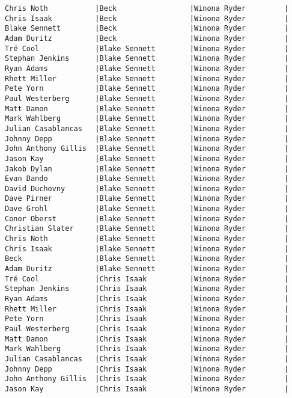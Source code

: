\documentclass{article}
\begin{document}
\begin{verbatim}
Chris Noth           |Beck                 |Winona Ryder         |
Chris Isaak          |Beck                 |Winona Ryder         |
Blake Sennett        |Beck                 |Winona Ryder         |
Adam Duritz          |Beck                 |Winona Ryder         |
Tré Cool             |Blake Sennett        |Winona Ryder         |
Stephan Jenkins      |Blake Sennett        |Winona Ryder         |
Ryan Adams           |Blake Sennett        |Winona Ryder         |
Rhett Miller         |Blake Sennett        |Winona Ryder         |
Pete Yorn            |Blake Sennett        |Winona Ryder         |
Paul Westerberg      |Blake Sennett        |Winona Ryder         |
Matt Damon           |Blake Sennett        |Winona Ryder         |
Mark Wahlberg        |Blake Sennett        |Winona Ryder         |
Julian Casablancas   |Blake Sennett        |Winona Ryder         |
Johnny Depp          |Blake Sennett        |Winona Ryder         |
John Anthony Gillis  |Blake Sennett        |Winona Ryder         |
Jason Kay            |Blake Sennett        |Winona Ryder         |
Jakob Dylan          |Blake Sennett        |Winona Ryder         |
Evan Dando           |Blake Sennett        |Winona Ryder         |
David Duchovny       |Blake Sennett        |Winona Ryder         |
Dave Pirner          |Blake Sennett        |Winona Ryder         |
Dave Grohl           |Blake Sennett        |Winona Ryder         |
Conor Oberst         |Blake Sennett        |Winona Ryder         |
Christian Slater     |Blake Sennett        |Winona Ryder         |
Chris Noth           |Blake Sennett        |Winona Ryder         |
Chris Isaak          |Blake Sennett        |Winona Ryder         |
Beck                 |Blake Sennett        |Winona Ryder         |
Adam Duritz          |Blake Sennett        |Winona Ryder         |
Tré Cool             |Chris Isaak          |Winona Ryder         |
Stephan Jenkins      |Chris Isaak          |Winona Ryder         |
Ryan Adams           |Chris Isaak          |Winona Ryder         |
Rhett Miller         |Chris Isaak          |Winona Ryder         |
Pete Yorn            |Chris Isaak          |Winona Ryder         |
Paul Westerberg      |Chris Isaak          |Winona Ryder         |
Matt Damon           |Chris Isaak          |Winona Ryder         |
Mark Wahlberg        |Chris Isaak          |Winona Ryder         |
Julian Casablancas   |Chris Isaak          |Winona Ryder         |
Johnny Depp          |Chris Isaak          |Winona Ryder         |
John Anthony Gillis  |Chris Isaak          |Winona Ryder         |
Jason Kay            |Chris Isaak          |Winona Ryder         |

\end{verbatim}
\end{document}

